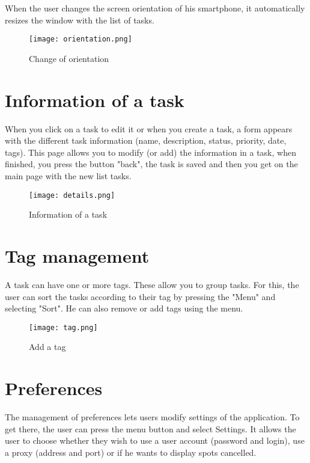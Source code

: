 \noindent When the user changes the screen orientation of his smartphone, it automatically resizes the window with the list of tasks.

\begin{figure}[!ht]
    \centering
    \texttt{[image: orientation.png]}
    \caption{Change of orientation}
\end{figure}

\section{Information of a task}

When you click on a task to edit it or when you create a task, a form appears with the different task information (name, description, status, priority, date, tags). This page allows you to modify (or add) the information in a task, when finished, you press the button "back", the task is saved and then you get on the main page with the new list tasks.

\begin{figure}[!ht]
    \centering
    \texttt{[image: details.png]}
    \caption{Information of a task}
\end{figure}

\section{Tag management}

A task can have one or more tags. These allow you to group tasks. For this, the user can sort the tasks according to their tag by pressing the "Menu" and selecting "Sort". He can also remove or add tags using the menu.

\begin{figure}[!ht]
    \centering
    \texttt{[image: tag.png]}
    \caption{Add a tag}
\end{figure}

\section{Preferences}

The management of preferences lets users modify settings of the application. To get there, the user can press the menu button and select Settings. It allows the user to choose whether they wish to use a user account (password and login), use a proxy (address and port) or if he wants to display spots cancelled.

